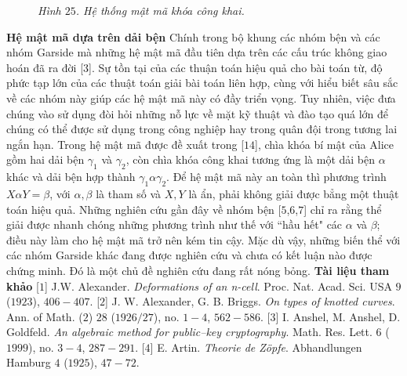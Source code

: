 \begin{multicols}{2}
\begin{figure}[H]
		\caption{\small\textit{\color{duongvaotoanhoc}Hình $25$. Hệ thống mật mã khóa công khai.}}
		\vspace*{-10pt}
	\end{figure}
	\textbf{\color{duongvaotoanhoc}Hệ mật mã dựa trên dải bện}
	\vskip 0.1cm
	Chính trong bộ khung các nhóm bện và các nhóm Garside mà những hệ mật mã đầu tiên dựa trên các cấu trúc không giao hoán đã ra đời [$3$]. Sự tồn tại của các thuận toán hiệu quả cho bài toán từ, độ phức tạp lớn của các thuật toán giải bài toán liên hợp, cùng với hiểu biết sâu sắc về các nhóm này giúp các hệ mật mã này có đầy triển vọng. Tuy nhiên, việc đưa chúng vào sử dụng đòi hỏi những nỗ lực về mặt kỹ thuật và đào tạo quá lớn để chúng có thể được sử dụng trong công nghiệp hay trong quân đội trong tương lai ngắn hạn.
	\vskip 0.1cm
	Trong hệ mật mã được đề xuất trong [$14$], chìa khóa bí mật của Alice gồm hai dải bện $\gamma_1$ và $\gamma_2$, còn chìa khóa công khai tương ứng là một dải bện $\alpha$ khác và dải bện hợp thành $\gamma_1 \alpha \gamma_2$. Để hệ mật mã này an toàn thì phương trình $X \alpha Y = \beta$, với $\alpha, \beta$ là tham số và $X, Y$ là ẩn, phải không giải được bẳng một thuật toán hiệu quả. Những nghiên cứu gần đây về nhóm bện [$5$,$6$,$7$] chỉ ra rằng thể giải được nhanh chóng những phương trình như thế với ``hầu hết" các $\alpha$ và $\beta$; điều này làm cho hệ mật mã trở nên kém tin cậy. Mặc dù vậy, những biến thể với các nhóm Garside khác đang được nghiên cứu và chưa có kết luận nào được chứng minh. Đó là một chủ đề nghiên cứu đang rất nóng bỏng.
	\vskip 0.1cm
	\textbf{\color{duongvaotoanhoc}Tài liệu tham khảo}
	\vskip 0.1cm
	[$1$] J.W. Alexander. \textit{Deformations of an n-cell}. Proc. Nat. Acad. Sci. USA $9$ ($1923$), $406-407$.
	\vskip 0.1cm
	[$2$] J. W. Alexander, G. B. Briggs. \textit{On types of knotted curves}. Ann. of Math. ($2$) $28$ ($1926/27$), no. $1-4$, $562-586$.
	\vskip 0.1cm
	[$3$] I. Anshel, M. Anshel, D. Goldfeld. \textit{An algebraic method for public--key cryptography}. Math. Res. Lett. $6$ ($1999$), no. $3-4$, $287-291$.
	\vskip 0.1cm
	[$4$] E. Artin. \textit{Theorie de Zöpfe}. Abhandlungen Hamburg $4$ ($1925$), $47-72$.

\end{multicols}
